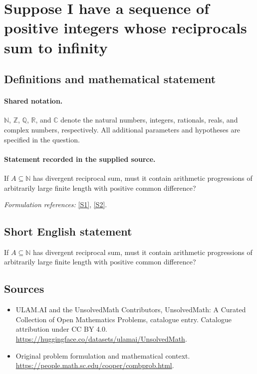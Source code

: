 \documentclass[11pt]{article}
\newcommand{\sref}[2]{\hyperlink{source:#1:#2}{[S#2]}}
\begin{document}
\section{Suppose I have a sequence of positive integers whose reciprocals sum to infinity}\label{statement}

\subsection{Definitions and mathematical statement}

\paragraph{Shared notation.}$\mathbb N$, $\mathbb Z$, $\mathbb Q$, $\mathbb R$, and $\mathbb C$ denote the natural numbers, integers, rationals, reals, and complex numbers, respectively. All additional parameters and hypotheses are specified in the question.


\paragraph{Statement recorded in the supplied source.}
If $A\subseteq\mathbb N$ has divergent reciprocal sum, must it contain arithmetic progressions of arbitrarily large finite length with positive common difference?
\par\smallskip\textit{Formulation references:} \sref{statement}{1}, \sref{statement}{2}.
\subsection{Short English statement}
If $A\subseteq\mathbb N$ has divergent reciprocal sum, must it contain arithmetic progressions of arbitrarily large finite length with positive common difference?
\subsection{Sources}
\begin{itemize}
\item[\hypertarget{source:statement:1}{S1}] ULAM.AI and the UnsolvedMath Contributors, UnsolvedMath: A Curated Collection of Open Mathematics Problems, catalogue entry. Catalogue attribution under CC BY 4.0.
\url{https://huggingface.co/datasets/ulamai/UnsolvedMath}.
\item[\hypertarget{source:statement:2}{S2}] Original problem formulation and mathematical context.
\url{https://people.math.sc.edu/cooper/combprob.html}.
\end{itemize}
\label{end:statement}
\end{document}
